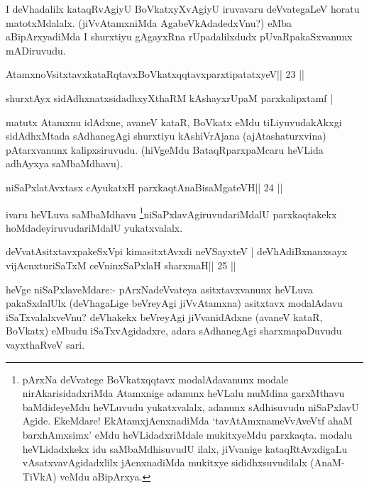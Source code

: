 \begin{artha}
I deVhadalilx kataqRvAgiyU BoVkatxyXvAgiyU iruvavaru deVvategaLeV horatu matotxMdalalx. (jiVvAtamxniMda AgabeVkAdadedxVnu?) eMba aBipArxyadiMda I shurxtiyu gAgayxRna rUpadalilxdudx pUvaRpakaSxvanunx mADiruvudu.
\end{artha}

\begin{shl}
AtamxnoV\s sitxtavxkataRqtavxBoVkatxqqtavxparxtipatatxyeV\hfill || 23 ||
\end{shl}

\begin{shl}
shurxtAyx sidAdhxnatxsidadhxyXthaRM kAshayxrUpaM parxkalipxtamf |
\end{shl}

\begin{artha}
matutx Atamxnu idAdxne, avaneV kataR, BoVkatx eMdu tiLiyuvudakAkxgi sidAdhxMtada sAdhanegAgi shurxtiyu kAshiVrAjana (ajAtashaturxvina) pAtarxvanunx kalipxsiruvudu. (hiVgeMdu BataqRparxpaMcaru heVLida adhAyxya saMbaMdhavu).
\end{artha} 


\begin{shl}
niSaPxlatAvxtasx cAyukatxH parxkaqtAnaBisaMgateVH\hfill || 24 ||
\end{shl}

\begin{artha}
ivaru heVLuva saMbaMdhavu \footnote{pArxNa deVvatege BoVkatxqqtavx 
modalAdavanunx modale nirAkarisidadxriMda Atamxnige adanunx heVLalu 
muMdina garxMthavu baMdideyeMdu heVLuvudu yukatxvalalx, adanunx sAdhisuvudu niSaPxlavU Agide. EkeMdare! EkAtamxjAcnxnadiMda `tavAtAmxnameVvAveVtf ahaM barxhAmxsimx' eMdu heVLidadxriMdale mukitxyeMdu parxkaqta. modalu heVLidadxkekx idu saMbaMdhisuvudU ilalx, jiVvanige kataqRtAvxdigaLu vAsatxvavAgidadxlilx jAcnxnadiMda mukitxye sididhxsuvudilalx (AnaM-TiVkA) veMdu aBipArxya.
}niSaPxlavAgiruvudariMdalU parxkaqtakekx hoMdadeyiruvudariMdalU yukatxvalalx.
\end{artha}

\begin{shl}
deVvatAsitxtavxpakeSxV\s pi kimasitxtAvxdi neVSayxteV |
deVhAdiBxnanxsayx vijAcnxturiSaTxM ceVninxSaPxlaH sharxmaH\hfill || 25 ||
\end{shl}

\begin{artha}
heVge niSaPxlaveMdare:- pArxNadeVvateya asitxtavxvanunx heVLuva  pakaSxdalUlx (deVhagaLige beVreyAgi jiVvAtamxna) asitxtavx modalAdavu  iSaTxvalalxveVnu? deVhakekx beVreyAgi jiVvanidAdxne (avaneV kataR, BoVkatx) eMbudu iSaTxvAgidadxre, adara sAdhanegAgi sharxmapaDuvudu vayxthaRveV sari.
\end{artha}

